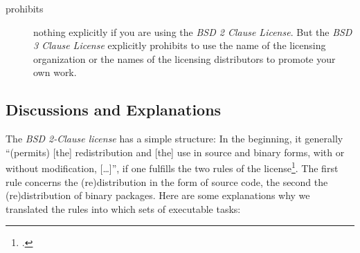 \begin{description}
\item[prohibits] nothing explicitly if you are using the \emph{BSD 2 Clause
License}. But the \emph{BSD 3 Clause License} explicitly prohibits to use the
name of the licensing organization or the names of the licensing distributors to
promote your own work.

\end{description}

\subsection{Discussions and Explanations}

The \textit{BSD 2-Clause license} has a simple structure: In the
beginning, it generally \enquote{(permits) [the] redistribution and [the] use in
source and binary forms, with or without modification, [\ldots]}, if one
fulfills the two rules of the license\footcite[cf.][\nopage
wp]{BsdLicense2Clause}. The first rule concerns the (re)distribution in the form of
source code, the second the (re)distribution of binary packages. Here are some
explanations why we translated the rules into which sets of executable tasks:

